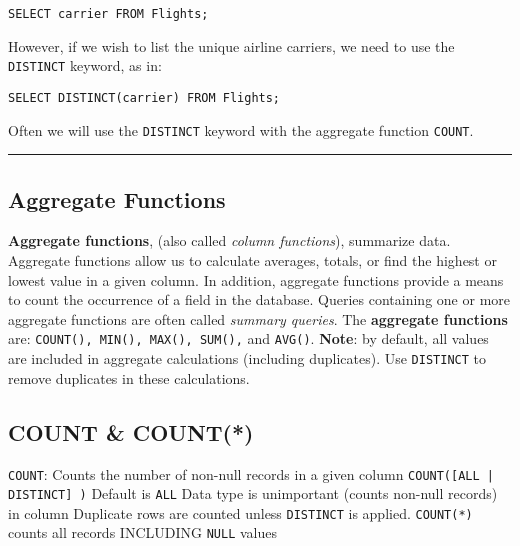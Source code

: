 \documentclass{article}
\begin{document}
\begin{lstlisting}[frame=single]  
SELECT carrier FROM Flights;
\end{lstlisting} 

\noindent However, if we wish to list the unique airline carriers, we need to use the \texttt{DISTINCT} keyword, as in: 


\begin{lstlisting}[frame=single]  
SELECT DISTINCT(carrier) FROM Flights;
\end{lstlisting} 

\noindent Often we will use the \texttt{DISTINCT} keyword with the aggregate function \texttt{COUNT}.    

\hspace{-0.5cm}\rule[-0.101in]{\textwidth}{0.0025in}
% 
% 
% 
% 
% 
% 
% 
% 
% 
% 
% 
% 






\subsection*{Aggregate Functions}
 
\textbf{Aggregate functions}, (also called \textit{column functions}), summarize data.  Aggregate functions allow us to calculate averages, totals, or find the highest or lowest value in a given column.  In addition, aggregate functions provide a means to count the occurrence of a field in the database.  Queries containing one or more aggregate functions are often called \textit{summary queries}. The \textbf{aggregate functions} are: \texttt{COUNT(), MIN(), MAX(), SUM(),} and \texttt{AVG()}.  \textbf{Note}:  by default, all values are included in aggregate calculations (including duplicates).  Use \texttt{DISTINCT} to remove duplicates in these calculations.  



\subsection*{COUNT \& COUNT(*)}


\begin{outline}
    \1 \texttt{COUNT}: Counts the number of non-null records  in a given column
        \2 \texttt{COUNT([ALL | DISTINCT] )}
                 \3 Default is \texttt{ALL}
        \2 Data type is unimportant (counts non-null records) in column
        \2 Duplicate rows are counted unless \texttt{DISTINCT} is applied.        
        \2 \texttt{COUNT(*)} counts all records INCLUDING \texttt{NULL} values
\end{outline}
\end{document}
